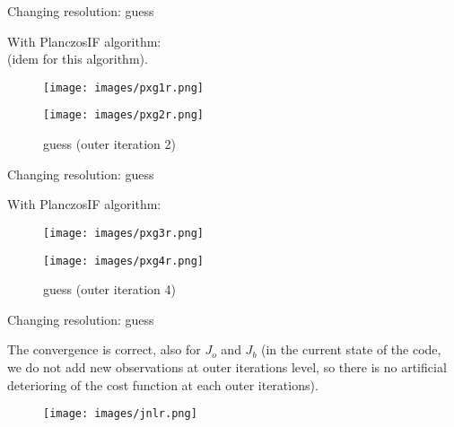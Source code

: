 \documentclass[francais]{beamer}
\begin{document}
\begin{frame}{Changing resolution: guess}
\begin{center}
With PlanczosIF algorithm:\\
(idem for this algorithm).
\begin{figure}
  \texttt{[image: images/pxg1r.png]}
  \caption{guess (outer iteration 1)}
\endminipage\hfill
{}
  \texttt{[image: images/pxg2r.png]}
  \caption{guess (outer iteration 2)}
\endminipage
\end{figure}
\end{center}
\end{frame}

\begin{frame}{Changing resolution: guess}
\begin{center}
With PlanczosIF algorithm:
\begin{figure}
  \texttt{[image: images/pxg3r.png]}
  \caption{guess (outer iteration 3)}
\endminipage \hfill
{}%
  \texttt{[image: images/pxg4r.png]}
  \caption{guess (outer iteration 4)}
\endminipage
\end{figure}
\end{center}
\end{frame}

\begin{frame}{Changing resolution: guess}
\begin{center}
The convergence is correct, also for $J_o$ and $J_b$ (in the current state of the code, we do not add new observations at outer iterations level, so there is no artificial deterioring of the cost function at each outer iterations).\\
\endminipage \hfill
{}%
\begin{figure}
  \texttt{[image: images/jnlr.png]}
\end{figure}
\endminipage
\end{center}
\end{frame}
\end{document}
